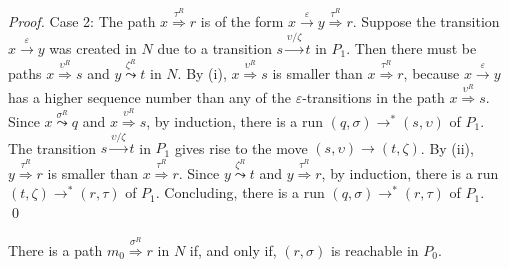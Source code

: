 \documentclass{llncs}
\newcommand{\eps}{\ensuremath{\varepsilon}}
\begin{document}
\begin{proof}
\vspace{1mm}

\noindent
{\sc Case 2}: The path $x\stackrel{\tau^R}{\Rightarrow}r$ is of the form $x\stackrel{\eps}{\rightarrow}y\stackrel{\tau^R}{\Rightarrow}r$.
Suppose the transition $x\stackrel{\eps}{\rightarrow}y$ was created in $N$ due to a transition $s\stackrel{\upsilon/\zeta}{\rightarrow}t$ in $P_1$.
Then there must be paths $x\stackrel{\upsilon^R}{\Rightarrow}s$ and $y\stackrel{\zeta^R}{\leadsto}t$ in $N$.
By (i), $x\stackrel{\upsilon^R}{\Rightarrow}s$ is smaller than $x\stackrel{\tau^R}{\Rightarrow}r$, because
$x\stackrel{\eps}{\rightarrow}y$ has a higher sequence number than any of the $\eps$-transitions in the path $x\stackrel{\upsilon^R}{\Rightarrow}s$.
Since $x\stackrel{\sigma^R}{\leadsto}q$ and $x\stackrel{\upsilon^R}{\Rightarrow}s$,
by induction, there is a run $(q,\sigma)\rightarrow^*(s,\upsilon)$ of $P_1$.
The transition $s\stackrel{\upsilon/\zeta}{\rightarrow}t$ in $P_1$ gives rise to the move $(s,\upsilon)\rightarrow(t,\zeta)$.
By (ii), $y\stackrel{\tau^R}{\Rightarrow}r$ is smaller than $x\stackrel{\tau^R}{\Rightarrow}r$.
Since $y\stackrel{\zeta^R}{\leadsto}t$ and $y\stackrel{\tau^R}{\Rightarrow}r$,
by induction, there is a run $(t,\zeta)\rightarrow^*(r,\tau)$ of $P_1$.
Concluding, there is a run $(q,\sigma)\rightarrow^*(r,\tau)$ of $P_1$.
\qed
\end{proof}

\begin{proposition}
\label{prop:nfa1}
There is a path $m_0\stackrel{\sigma^R}{\Rightarrow}r$ in $N$ if, and only if, $(r,\sigma)$ is reachable in $P_0$.
\end{proposition}
\end{document}
